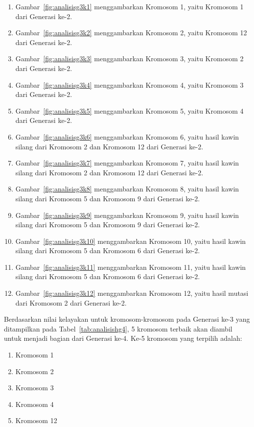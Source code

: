 \begin{enumerate}
\item Gambar~\ref{fig:analisisg3k1} menggambarkan Kromosom 1, yaitu Kromosom 1 dari Generasi ke-2.
\item Gambar~\ref{fig:analisisg3k2} menggambarkan Kromosom 2, yaitu Kromosom 12 dari Generasi ke-2.
\item Gambar~\ref{fig:analisisg3k3} menggambarkan Kromosom 3, yaitu Kromosom 2 dari Generasi ke-2.
\item Gambar~\ref{fig:analisisg3k4} menggambarkan Kromosom 4, yaitu Kromosom 3 dari Generasi ke-2.
\item Gambar~\ref{fig:analisisg3k5} menggambarkan Kromosom 5, yaitu Kromosom 4 dari Generasi ke-2.
\item Gambar~\ref{fig:analisisg3k6} menggambarkan Kromosom 6, yaitu hasil kawin silang dari Kromosom 2 dan Kromosom 12 dari Generasi ke-2.
\item Gambar~\ref{fig:analisisg3k7} menggambarkan Kromosom 7, yaitu hasil kawin silang dari Kromosom 2 dan Kromosom 12 dari Generasi ke-2.
\item Gambar~\ref{fig:analisisg3k8} menggambarkan Kromosom 8, yaitu hasil kawin silang dari Kromosom 5 dan Kromosom 9 dari Generasi ke-2.
\item Gambar~\ref{fig:analisisg3k9} menggambarkan Kromosom 9, yaitu hasil kawin silang dari Kromosom 5 dan Kromosom 9 dari Generasi ke-2.
\item Gambar~\ref{fig:analisisg3k10} menggambarkan Kromosom 10, yaitu hasil kawin silang dari Kromosom 5 dan Kromosom 6 dari Generasi ke-2.
\item Gambar~\ref{fig:analisisg3k11} menggambarkan Kromosom 11, yaitu hasil kawin silang dari Kromosom 5 dan Kromosom 6 dari Generasi ke-2.
\item Gambar~\ref{fig:analisisg3k12} menggambarkan Kromosom 12, yaitu hasil mutasi dari Kromosom 2 dari Generasi ke-2.
\end{enumerate}

\clearpage

Berdasarkan nilai kelayakan untuk kromosom-kromosom pada Generasi ke-3 yang ditampilkan pada Tabel~\ref{tab:analisishg4}, 5 kromosom terbaik akan diambil untuk menjadi bagian dari Generasi ke-4. Ke-5 kromosom yang terpilih adalah:
\begin{enumerate}
\item Kromosom 1
\item Kromosom 2
\item Kromosom 3
\item Kromosom 4
\item Kromosom 12
\end{enumerate}

